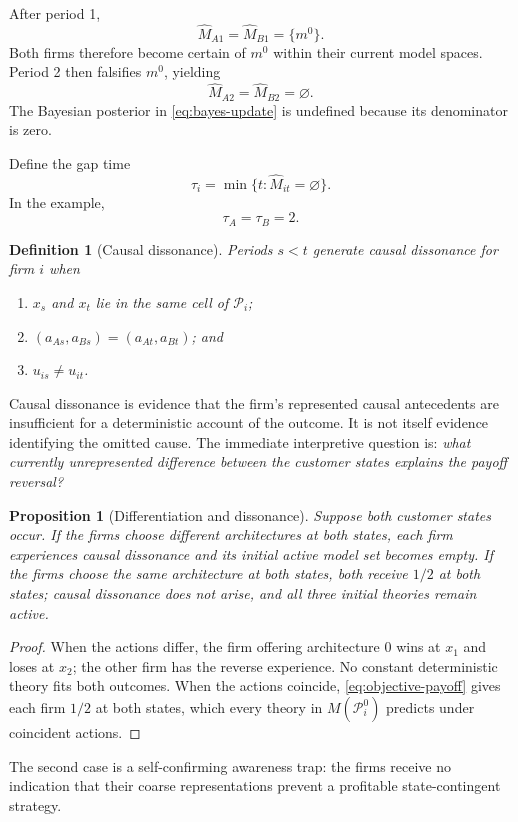 \documentclass[11pt]{article}
\newtheorem{definition}{Definition}
\newtheorem{proposition}{Proposition}
\newcommand{\emptysetset}{\varnothing}
\begin{document}
After period 1,
\[
\widehat M_{A1}=\widehat M_{B1}=\{m^0\}.
\]
Both firms therefore become certain of $m^0$ within their current model spaces.  Period 2 then falsifies $m^0$, yielding
\[
\widehat M_{A2}=\widehat M_{B2}=\emptysetset.
\]
The Bayesian posterior in \eqref{eq:bayes-update} is undefined because its denominator is zero.

Define the gap time
\[
\tau_i=\min\{t:\widehat M_{it}=\emptysetset\}.
\]
In the example,
\[
\tau_A=\tau_B=2.
\]

\begin{definition}[Causal dissonance]
Periods $s<t$ generate causal dissonance for firm $i$ when
\begin{enumerate}[label=(\alph*)]
  \item $x_s$ and $x_t$ lie in the same cell of $\mathcal P_i$;
  \item $(a_{As},a_{Bs})=(a_{At},a_{Bt})$; and
  \item $u_{is}\neq u_{it}$.
\end{enumerate}
\end{definition}

Causal dissonance is evidence that the firm's represented causal antecedents are insufficient for a deterministic account of the outcome.  It is not itself evidence identifying the omitted cause.  The immediate interpretive question is: \emph{what currently unrepresented difference between the customer states explains the payoff reversal?}

\begin{proposition}[Differentiation and dissonance]
Suppose both customer states occur.  If the firms choose different architectures at both states, each firm experiences causal dissonance and its initial active model set becomes empty.  If the firms choose the same architecture at both states, both receive $1/2$ at both states; causal dissonance does not arise, and all three initial theories remain active.
\end{proposition}

\begin{proof}
When the actions differ, the firm offering architecture 0 wins at $x_1$ and loses at $x_2$; the other firm has the reverse experience.  No constant deterministic theory fits both outcomes.  When the actions coincide, \eqref{eq:objective-payoff} gives each firm $1/2$ at both states, which every theory in $M(\mathcal P_i^0)$ predicts under coincident actions.
\end{proof}

The second case is a self-confirming awareness trap: the firms receive no indication that their coarse representations prevent a profitable state-contingent strategy.
\end{document}
